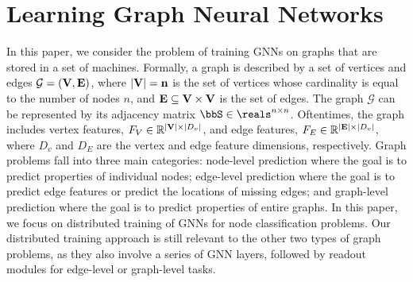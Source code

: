 \documentclass[lettersize,journal]{IEEEtran}
\begin{document}
\section{Learning Graph Neural Networks}

In this paper, we consider the problem of training GNNs on graphs that are stored in a set of machines. Formally, a graph is described by a set of vertices and edges $\mathcal{G} = ({\bf V},{\bf E})$, where $|\bf V|=n$ is the set of vertices whose cardinality is equal to the number of nodes $n$, and ${\bf E} \subseteq {\bf V}\times{\bf V}$ is the set of edges. The graph $\mathcal{G}$ can be represented by its adjacency matrix $\bbS\in \reals^{n\times n}$. 
Oftentimes, the graph includes vertex features, $F_V \in \mathbb{R}^{|{\bf V}| \times |D_v|}$, and edge features, $F_E \in \mathbb{R}^{|{\bf E}| \times |D_v|}$, where $D_v$ and $D_E$ are the vertex and edge feature dimensions, respectively. Graph problems fall into three main categories: node-level prediction where the goal is to predict properties of individual nodes; edge-level prediction where the goal is to predict edge features or predict the locations of missing edges; and graph-level prediction where the goal is to predict properties of entire graphs. In this paper, we focus on distributed training of GNNs for node classification problems. Our distributed training approach is still relevant to the other two types of graph problems, as they also involve a series of GNN layers, followed by readout modules for edge-level or graph-level tasks.
\end{document}
